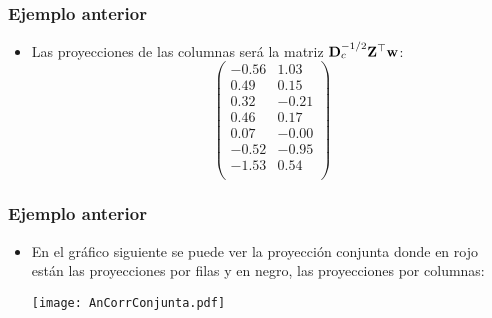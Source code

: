 \begin{frame}
\frametitle{Ejemplo anterior}
\begin{itemize}
\item<2->{Las proyecciones de las columnas será la matriz $\mathbf{D}_c^{-1/2}\mathbf{Z}^\top\mathbf{w}$:
$$\begin{pmatrix}
-0.56 & 1.03 \\
0.49 & 0.15 \\
0.32 & -0.21 \\
0.46 & 0.17 \\
0.07 & -0.00 \\
-0.52 & -0.95 \\
-1.53 & 0.54 \\
\end{pmatrix}$$
}
\end{itemize}
\end{frame}
\begin{frame}
\frametitle{Ejemplo anterior}
\begin{itemize}
\item<2->{En el gráfico siguiente se puede ver la proyección conjunta donde en rojo están las proyecciones por filas y en negro, las proyecciones por columnas:
\begin{center}
\texttt{[image: AnCorrConjunta.pdf]}
\end{center}}
\end{itemize}
\end{frame}
